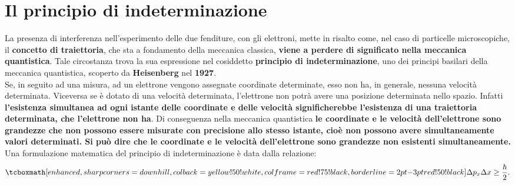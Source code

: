 \section{Il principio di indeterminazione}
La presenza di interferenza nell'esperimento delle due fenditure, con gli elettroni, mette in risalto come, nel caso di particelle microscopiche, il \textbf{concetto di traiettoria}, che sta a fondamento della meccanica classica, \textbf{viene a perdere di significato nella meccanica quantistica}. Tale circostanza trova la sua espressione nel cosiddetto \textbf{principio di indeterminazione}, uno dei principi basilari della meccanica quantistica, scoperto da \textbf{Heisenberg} nel \textbf{1927}.\\
Se, in seguito ad una misura, ad un elettrone vengono assegnate coordinate determinate, esso non ha, in generale, nessuna velocità determinata. Viceversa se è dotato di una velocità determinata, l'elettrone non potrà avere una posizione determinata nello spazio. Infatti \textbf{l'esistenza simultanea ad ogni istante delle coordinate e delle velocità significherebbe l'esistenza di una traiettoria determinata, che l'elettrone non ha}. Di conseguenza nella meccanica quantistica \textbf{le coordinate e le velocità dell'elettrone sono grandezze che non possono essere misurate con precisione allo stesso istante, cioè non possono avere simultaneamente valori determinati. Si può dire che le coordinate e le velocità dell'elettrone sono grandezze non esistenti simultaneamente.}\\
Una formulazione matematica del principio di indeterminazione è data dalla relazione:
	\begin{equation}
		\tcboxmath[enhanced,sharp corners=downhill ,colback=yellow!50!white,colframe=red!75!black, borderline={2pt}{-3pt}{red!50!black}]{
			\Delta p_x \Delta x \geq \frac{\hbar}{2}.
			}
	\end{equation}
